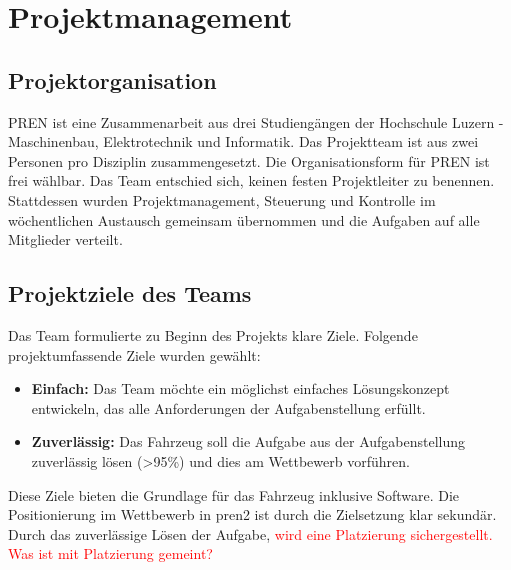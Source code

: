 \documentclass[../main.tex]{subfiles}
\begin{document}
\newpage
\section{Projektmanagement}

\subsection {Projektorganisation}
PREN ist eine Zusammenarbeit aus drei Studiengängen der Hochschule Luzern - Maschinenbau, Elektrotechnik und Informatik. Das Projektteam ist aus zwei Personen pro Disziplin zusammengesetzt. Die Organisationsform für PREN ist frei wählbar. Das Team entschied sich, keinen festen Projektleiter zu benennen. Stattdessen wurden Projektmanagement, Steuerung und Kontrolle im wöchentlichen Austausch gemeinsam übernommen und die Aufgaben auf alle Mitglieder verteilt.

\subsection{Projektziele des Teams}
Das Team formulierte zu Beginn des Projekts klare Ziele. Folgende projektumfassende Ziele wurden gewählt:
\begin{itemize}
\item \textbf{Einfach:} Das Team möchte ein möglichst einfaches Lösungskonzept entwickeln, das alle Anforderungen der Aufgabenstellung erfüllt.
\item \textbf{Zuverlässig:} Das Fahrzeug soll die Aufgabe aus der Aufgabenstellung zuverlässig lösen (>95\%) und dies am Wettbewerb vorführen.
\end{itemize}

Diese Ziele bieten die Grundlage für das Fahrzeug inklusive Software.
Die Positionierung im Wettbewerb in \acrshort{pren2} ist durch die Zielsetzung klar sekundär. Durch das zuverlässige Lösen der Aufgabe, \textcolor{red}{wird eine Platzierung sichergestellt. Was ist mit Platzierung gemeint?}
\end{document}
